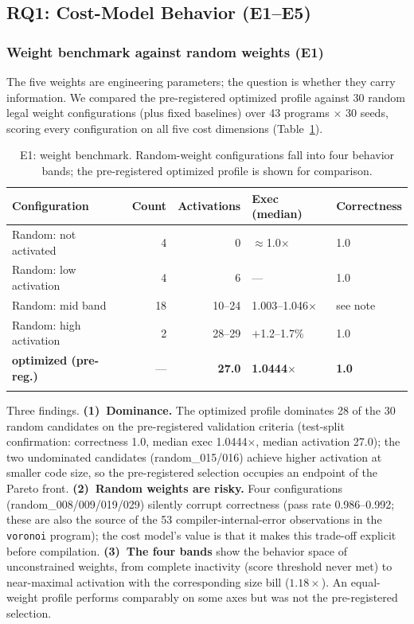 \documentclass[pdflatex,sn-mathphys-num]{sn-jnl}
\theoremstyle{thmstyleone}%
\theoremstyle{thmstyletwo}%
\theoremstyle{thmstylethree}%
\begin{document}
\subsection{RQ1: Cost-Model Behavior (E1--E5)}

\subsubsection{Weight benchmark against random weights (E1)}
The five weights are engineering parameters; the question is whether they carry
information. We compared the pre-registered optimized profile against 30 random legal
weight configurations (plus fixed baselines) over 43 programs $\times$ 30 seeds,
scoring every configuration on all five cost dimensions (Table~\ref{tab:e1_weights}).

\begin{table}[!t]
\centering
\footnotesize
\caption{E1: weight benchmark. Random-weight configurations fall into four behavior
bands; the pre-registered optimized profile is shown for comparison.}
\label{tab:e1_weights}
\begin{tabular}{lrrll}
\toprule
Configuration & Count & Activations & Exec (median) & Correctness \\
\midrule
Random: not activated & 4 & 0 & $\approx$1.0$\times$ & 1.0 \\
Random: low activation & 4 & 6 & --- & 1.0 \\
Random: mid band & 18 & 10--24 & 1.003--1.046$\times$ & see note \\
Random: high activation & 2 & 28--29 & $+$1.2--1.7\% & 1.0 \\
\textbf{optimized (pre-reg.)} & --- & \textbf{27.0} & \textbf{1.0444$\times$} & \textbf{1.0} \\
\botrule
\end{tabular}
\end{table}

Three findings. \textbf{(1)~Dominance.} The optimized profile dominates 28 of the 30
random candidates on the pre-registered validation criteria (test-split confirmation:
correctness 1.0, median exec 1.0444$\times$, median activation 27.0); the two
undominated candidates (random\_015/016) achieve higher activation at smaller code
size, so the pre-registered selection occupies an endpoint of the Pareto front.
\textbf{(2)~Random weights are risky.} Four configurations (random\_008/009/019/029)
silently corrupt correctness (pass rate 0.986--0.992; these are also the source of the
53 compiler-internal-error observations in the \texttt{voronoi} program); the cost
model's value is that it makes this trade-off explicit before compilation.
\textbf{(3)~The four bands} show the behavior space of unconstrained weights, from
complete inactivity (score threshold never met) to near-maximal activation with the
corresponding size bill ($1.18\times$). An equal-weight profile performs comparably
on some axes but was not the pre-registered selection.
\end{document}
